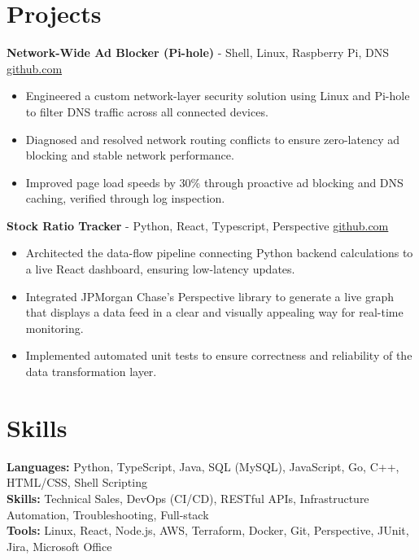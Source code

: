 \documentclass[11pt]{article}       %
\begin{document}
\vspace{-18.5pt}

\section*{Projects}

\textbf{Network-Wide Ad Blocker (Pi-hole)}{ - Shell, Linux, Raspberry Pi, DNS} \hfill \href{https://github.com/Monica20030707}{github.com} \\
\vspace{-9pt}
\begin{itemize}
  \item Engineered a custom network-layer security solution using Linux and Pi-hole to filter DNS traffic across all connected devices.
  \item Diagnosed and resolved network routing conflicts to ensure zero-latency ad blocking and stable network performance.
  \item Improved page load speeds by 30\% through proactive ad blocking and DNS caching, verified through log inspection.
\end{itemize}

\textbf{Stock Ratio Tracker}{ - Python, React, Typescript, Perspective} \hfill \href{https://github.com/Monica20030707/tradingDashboard-UI}{github.com} \\
\vspace{-9pt}
\begin{itemize}
  \item Architected the data-flow pipeline connecting Python backend calculations to a live React dashboard, ensuring low-latency updates. 
  \item Integrated JPMorgan Chase’s Perspective library to generate a live graph that displays a data feed in a clear and visually appealing way for real-time monitoring.
  \item Implemented automated unit tests to ensure correctness and reliability of the data transformation layer.
\end{itemize}

\vspace{-18.5pt}


\section*{Skills}
\textbf{Languages:} Python, TypeScript, Java, SQL (MySQL), JavaScript, Go, C++, HTML/CSS, Shell Scripting\\
\textbf{Skills:} Technical Sales, DevOps (CI/CD), RESTful APIs, Infrastructure Automation, Troubleshooting, Full-stack\\
\textbf{Tools:} Linux, React, Node.js, AWS, Terraform, Docker, Git, Perspective, JUnit, Jira, Microsoft Office\\

\vspace{-6.5pt}
\end{document}
